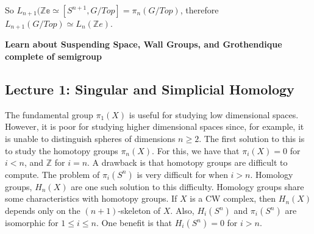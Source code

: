 \documentclass[crop=false,class=book,oneside]{standalone}                      %
\begin{document}
        So $L_{n+1}(\mathbb{Ze}\simeq[S^{n+1},G/Top]%
            =\pi_{n}(G/Top)$,
        therefore $L_{n+1}(G/Top)\simeq{L_{n}(\mathbb{Z}e)}$.
        \par\hfill\par
        \textbf{Learn about Suspending Space, Wall Groups,
                and Grothendique complete of semigroup}
    \subsection{Lecture 1: Singular and Simplicial Homology}
            The fundamental group $\pi_{1}(X)$ is useful for
            studying low dimensional spaces. However, it is poor for
            studying higher dimensional spaces since, for example,
            it is unable to distinguish spheres of dimensions
            $n\geq 2$. The first solution to this is to study
            the homotopy groups $\pi_{n}(X)$. For this, we have
            that $\pi_{i}(X)=0$ for $i<n$, and $\mathbb{Z}$ for
            $i=n$. A drawback is that homotopy groups are
            difficult to compute. The problem of $\pi_{i}(S^{n})$
            is very difficult for when $i>n$. Homology groups,
            $H_{n}(X)$ are one such solution to this difficulty.
            Homology groups share some characteristics with
            homotopy groups. If $X$ is a CW complex, then $H_{n}(X)$
            depends only on the $(n+1)$-skeleton of $X$. Also,
            $H_{i}(S^{n})$ and $\pi_{i}(S^{n})$ are isomorphic for
            $1\leq i\leq n$. One benefit is that $H_{i}(S^{n})=0$
            for $i>n$.
\end{document}
